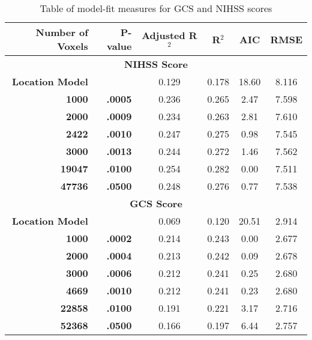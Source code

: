 \begin{table}[H]
\centering
\begin{tabular}{rr|cccc}
  \hline
{\bf Number of Voxels} & {\bf P-value} & {\bf Adjusted R$^2$} & {\bf R$^2$} & {\bf AIC} & {\bf RMSE} \\ 
  \hline \multicolumn{6}{c}{\bf NIHSS Score }\\ 
 \hline
\bf Location Model & \bf  & 0.129 & 0.178 & 18.60 & 8.116 \\ 
  \bf 1000 & \bf .0005 & 0.236 & 0.265 & 2.47 & 7.598 \\ 
  \bf 2000 & \bf .0009 & 0.234 & 0.263 & 2.81 & 7.610 \\ 
  \bf 2422 & \bf .0010 & 0.247 & 0.275 & 0.98 & 7.545 \\ 
  \bf 3000 & \bf .0013 & 0.244 & 0.272 & 1.46 & 7.562 \\ 
  \bf 19047 & \bf .0100 & 0.254 & 0.282 & 0.00 & 7.511 \\ 
  \bf 47736 & \bf .0500 & 0.248 & 0.276 & 0.77 & 7.538 \\ 
    \hline\hline \multicolumn{6}{c}{\bf GCS Score }\\ 
\hline \bf Location Model & \bf  & 0.069 & 0.120 & 20.51 & 2.914 \\ 
  \bf 1000 & \bf .0002 & 0.214 & 0.243 & 0.00 & 2.677 \\ 
  \bf 2000 & \bf .0004 & 0.213 & 0.242 & 0.09 & 2.678 \\ 
  \bf 3000 & \bf .0006 & 0.212 & 0.241 & 0.25 & 2.680 \\ 
  \bf 4669 & \bf .0010 & 0.212 & 0.241 & 0.23 & 2.680 \\ 
  \bf 22858 & \bf .0100 & 0.191 & 0.221 & 3.17 & 2.716 \\ 
  \bf 52368 & \bf .0500 & 0.166 & 0.197 & 6.44 & 2.757 \\ 
   \hline
\end{tabular}
\caption{Table of model-fit measures for GCS and NIHSS scores} 
\label{t:allres}
\end{table}

